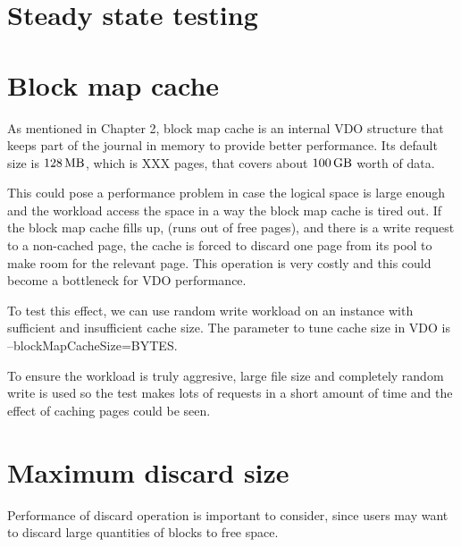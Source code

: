 \documentclass[
  color, %
  table, %
  lof,   %
  lot,   %
]{fithesis3}
\begin{document}
\section{Steady state testing}

\section{Block map cache}
As mentioned in Chapter 2, block map cache is an internal VDO structure that keeps part of the journal in memory to provide better performance. Its default size is $\SI{128}{\mega\byte}$, which is XXX pages, that covers about $\SI{100}{\giga\byte}$ worth of data. 

This could pose a performance problem in case the logical space is large enough and the workload access the space in a way the block map cache is tired out. If the block map cache fills up, (runs out of free pages), and there is a write request to a non-cached page, the cache is forced to discard one page from its pool to make room for the relevant page. This operation is very costly and this could become a bottleneck for VDO performance.



To test this effect, we can use random write workload on an instance with sufficient and insufficient cache size. The parameter to tune cache size in VDO is --blockMapCacheSize=BYTES.


To ensure the workload is truly aggresive, large file size and completely random write is used so the test makes lots of requests in a short amount of time and the effect of caching pages could be seen.



\section{Maximum discard size}
Performance of discard operation is important to consider, since users may want to discard large quantities of blocks to free space.
\end{document}
